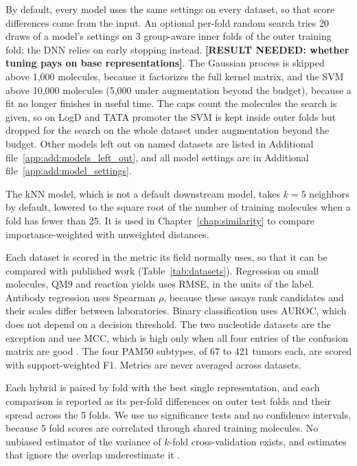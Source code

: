 By default, every model uses the same settings on every dataset, so that score differences come from the input. An optional per-fold random search tries 20 draws of a model's settings on 3 group-aware inner folds of the outer training fold; the DNN relies on early stopping instead. \textbf{[RESULT NEEDED: whether tuning pays on base representations]}. The Gaussian process is skipped above 1,000 molecules, because it factorizes the full kernel matrix, and the SVM above 10,000 molecules (5,000 under augmentation beyond the budget), because a fit no longer finishes in useful time. The caps count the molecules the search is given, so on LogD and TATA promoter the SVM is kept inside outer folds but dropped for the search on the whole dataset under augmentation beyond the budget. Other models left out on named datasets are listed in Additional file~\ref{app:add:models_left_out}, and all model settings are in Additional file~\ref{app:add:model_settings}.

The kNN model, which is not a default downstream model, takes $k = 5$ neighbors by default, lowered to the square root of the number of training molecules when a fold has fewer than 25. It is used in Chapter~\ref{chap:similarity} to compare importance-weighted with unweighted distances.

Each dataset is scored in the metric its field normally uses, so that it can be compared with published work (Table~\ref{tab:datasets}). Regression on small molecules, QM9 and reaction yields uses RMSE, in the units of the label. Antibody regression uses Spearman $\rho$, because these assays rank candidates and their scales differ between laboratories. Binary classification uses AUROC, which does not depend on a decision threshold. The two nucleotide datasets are the exception and use MCC, which is high only when all four entries of the confusion matrix are good \citep{Chicco2020}. The four PAM50 subtypes, of 67 to 421 tumors each, are scored with support-weighted F1. Metrics are never averaged across datasets.

Each hybrid is paired by fold with the best single representation, and each comparison is reported as its per-fold differences on outer test folds and their spread across the 5 folds. We use no significance tests and no confidence intervals, because 5 fold scores are correlated through shared training molecules. No unbiased estimator of the variance of $k$-fold cross-validation exists, and estimates that ignore the overlap underestimate it \citep{Bengio2004}.

